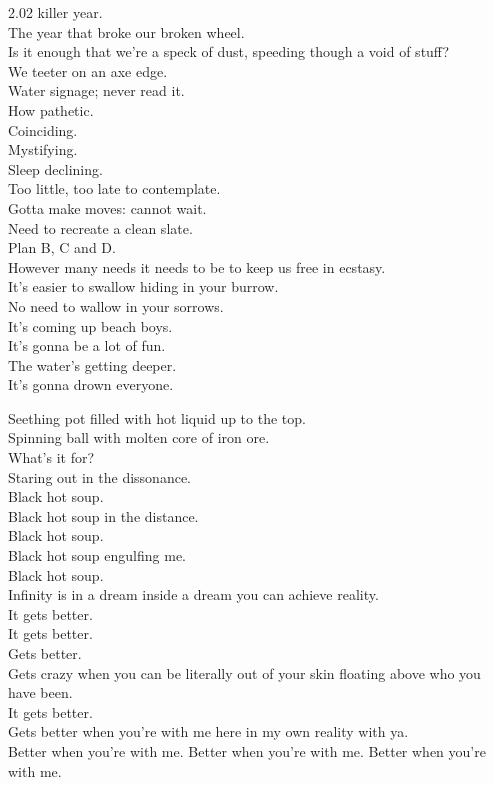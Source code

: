 2.02 killer year. \\
The year that broke our broken wheel. \\
Is it enough that we're a speck of dust, speeding though a void of stuff? \\
We teeter on an axe edge. \\

Water signage; never read it. \\
How pathetic. \\
Coinciding. \\
Mystifying. \\
Sleep declining. \\
Too little, too late to contemplate. \\
Gotta make moves: cannot wait. \\
Need to recreate a clean slate. \\
Plan B, C and D. \\
However many needs it needs to be to keep us free in ecstasy. \\
It's easier to swallow hiding in your burrow. \\
No need to wallow in your sorrows. \\

It's coming up beach boys. \\
It's gonna be a lot of fun. \\
The water's getting deeper. \\
It's gonna drown everyone. \\




Seething pot filled with hot liquid up to the top. \\
Spinning ball with molten core of iron ore. \\
What's it for? \\

Staring out in the dissonance. \\
Black hot soup. \\
Black hot soup in the distance. \\
Black hot soup. \\
Black hot soup engulfing me. \\
Black hot soup. \\

Infinity is in a dream inside a dream you can achieve reality. \\
It gets better. \\
It gets better. \\
Gets better. \\
Gets crazy when you can be literally out of your skin floating above who you have been. \\
It gets better. \\
Gets better when you're with me here in my own reality with ya. \\
Better when you're with me. Better when you're with me. Better when you're with me. \\

